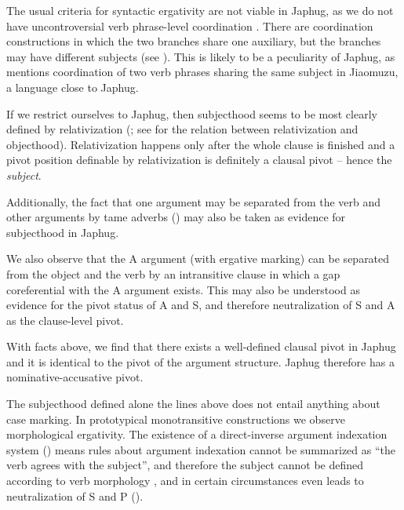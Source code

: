 \documentclass[a4paper, oneside, 12pt]{report}
\newcommand*{\citepage}[1]{p.~{#1}}
\newcommand*{\term}[1]{\emph{#1}}
\begin{document}
The usual criteria for syntactic ergativity are not viable in Japhug,
as we do not have uncontroversial verb phrase-level coordination \citep{jacques2014clause}.
There are coordination constructions in which the two branches share one auxiliary,
but the branches may have different subjects
(see ).
This is likely to be a peculiarity of Japhug,
as \citet[\citepage{549}]{prins2011web} mentions 
coordination of two verb phrases sharing the same subject
in Jiaomuzu, a language close to Japhug.

If we restrict ourselves to Japhug, then subjecthood seems to be 
most clearly defined by relativization
(\citealt{jacques2016subjects};
see  for the relation 
between relativization and objecthood).
Relativization happens only after the whole clause is finished
and a pivot position definable by relativization is definitely a clausal pivot
-- hence the \term{subject}.

Additionally, the fact that one argument may be separated from
the verb and other arguments by \ac{tame} adverbs
()
may also be taken as evidence for subjecthood in Japhug.

We also observe that the A argument (with ergative marking) 
can be separated from the object and the verb 
by an intransitive clause \citep[\citepage{306}]{jacques2021grammar}
in which a gap coreferential with the A argument exists.
This may also be understood as evidence for the pivot status of A and S,
and therefore neutralization of S and A as the clause-level pivot.

With facts above, we find that there exists a well-defined clausal pivot in Japhug
and it is identical to the pivot of the argument structure.
Japhug therefore has a nominative-accusative pivot.

The subjecthood defined alone the lines above does not entail
anything about case marking.
In prototypical monotransitive constructions
we observe morphological ergativity.
The existence of a direct-inverse argument indexation system ()
means rules about argument indexation cannot be summarized as 
``the verb agrees with the subject'',
and therefore the subject cannot be defined according to verb morphology \citep{jacques2016subjects},
and in certain circumstances even leads to neutralization of S and P
().
\end{document}
